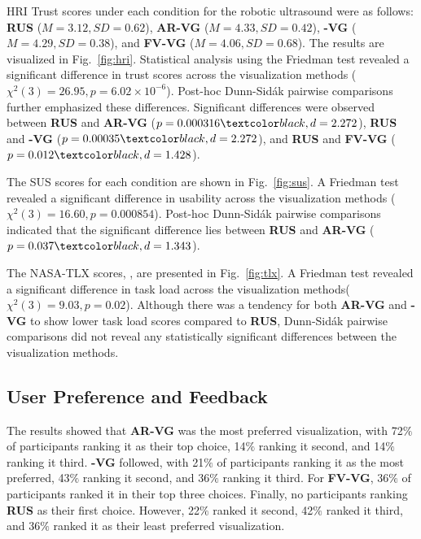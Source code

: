 HRI Trust scores under each condition for the robotic ultrasound were as follows: \textbf{RUS} ($M = 3.12, SD = 0.62$), \textbf{AR-VG} ($M = 4.33, SD = 0.42$), \textbf{-VG} ($M = 4.29, SD = 0.38$), and \textbf{FV-VG} ($M = 4.06, SD = 0.68$). The results are visualized in Fig.~\ref{fig:hri}.
Statistical analysis using the Friedman test revealed a significant difference in trust scores across the visualization methods ($\chi^2(3) = 26.95, p = 6.02 \times 10^{-6}$). Post-hoc Dunn-Sid{\'a}k  pairwise comparisons further emphasized these differences. Significant differences were observed between \textbf{RUS} and \textbf{AR-VG} ($p = 0.000316\add{, d = 2.272}$), \textbf{RUS} and \textbf{-VG} ($p = 0.00035\add{, d = 2.272}$), and \textbf{RUS} and \textbf{FV-VG} ($p = 0.012\add{, d = 1.428}$).

The SUS scores for each condition are shown in Fig.~\ref{fig:sus}. A Friedman test revealed a significant difference in usability across the visualization methods ($\chi^2(3) = 16.60, p = 0.000854$). Post-hoc Dunn-Sid{\'a}k  pairwise comparisons indicated that the significant difference lies between \textbf{RUS} and \textbf{AR-VG} ($p = 0.037\add{, d = 1.343}$).

The NASA-TLX scores, , are presented in Fig.~\ref{fig:tlx}. A Friedman test revealed a significant difference in task load across the visualization methods($\chi^2(3) = 9.03, p = 0.02$).
Although there was a tendency for both \textbf{AR-VG} and \textbf{-VG} to show lower task load scores compared to \textbf{RUS}, Dunn-Sid{\'a}k  pairwise comparisons did not reveal any statistically significant differences between the visualization methods.


\subsection{User Preference and Feedback}



The results showed that \textbf{AR-VG} was the most preferred visualization, with 72$\%$ of participants ranking it as their top choice, 14$\%$ ranking it second, and 14$\%$ ranking it third. \textbf{-VG} followed, with 21$\%$ of participants ranking it as the most preferred, 43$\%$ ranking it second, and 36$\%$ ranking it third. For \textbf{FV-VG}, 36$\%$ of participants ranked it in their top three choices. Finally, no participants ranking \textbf{RUS} as their first choice. However, 22$\%$ ranked it second, 42$\%$ ranked it third, and 36$\%$ ranked it as their least preferred visualization.

